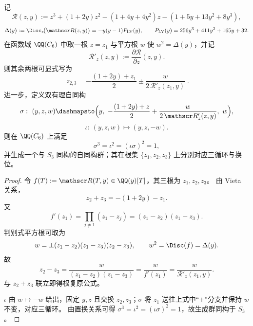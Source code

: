 \begin{theorem}\label{thm:xi-terminal-zm-s3-root-recovery-coordinate-automorphisms}
记
\[
\mathscr R(z,y):=z^3+(1+2y)z^2-(1+4y+4y^2)z-(1+5y+13y^2+8y^3),
\]
\[
\Delta(y):=\Disc_z\!\bigl(\mathscr R(z,y)\bigr)=-y(y-1)P_{\mathrm{LY}}(y),
\qquad
P_{\mathrm{LY}}(y)=256y^3+411y^2+165y+32.
\]
在函数域 \(\QQ(C_6)\) 中取一根 \(z=z_1\) 与平方根 \(w\) 使 \(w^2=\Delta(y)\)，并记
\[
\mathscr R'_z(z,y):=\frac{\partial\mathscr R}{\partial z}(z,y).
\]
则其余两根可显式写为
\[
\boxed{\;
z_{2,3}
=-\frac{(1+2y)+z_1}{2}
\pm
\frac{w}{2\,\mathscr R'_z(z_1,y)}\; }.
\]
进一步，定义双有理自同构
\[
\sigma:\ (y,z,w)\dashmapsto
\Bigl(
y,\ -\frac{(1+2y)+z}{2}+\frac{w}{2\,\mathscr R'_z(z,y)},\ w
\Bigr),
\]
\[
\iota:\ (y,z,w)\mapsto (y,z,-w).
\]
则在 \(\QQ(C_6)\) 上满足
\[
\sigma^3=\iota^2=(\iota\sigma)^2=1,
\]
并生成一个与 \(S_3\) 同构的自同构群；其在根集 \(\{z_1,z_2,z_3\}\) 上分别对应三循环与换位。
\end{theorem}
\begin{proof}
令 \(f(T):=\mathscr R(T,y)\in\QQ(y)[T]\)，其三根为 \(z_1,z_2,z_3\)。
由 Vieta 关系，
\[
z_2+z_3=-(1+2y)-z_1.
\]
又
\[
f'(z_1)=\prod_{j\neq1}(z_1-z_j)=(z_1-z_2)(z_1-z_3).
\]
判别式平方根可取为
\[
w=\pm (z_1-z_2)(z_1-z_3)(z_2-z_3),
\qquad
w^2=\Disc(f)=\Delta(y).
\]
故
\[
z_2-z_3=\frac{w}{(z_1-z_2)(z_1-z_3)}=\frac{w}{f'(z_1)}=\frac{w}{\mathscr R'_z(z_1,y)}.
\]
与 \(z_2+z_3\) 联立即得根复原公式。

\(\iota\) 由 \(w\mapsto-w\) 给出，固定 \(y,z\) 且交换 \(z_2,z_3\)；\(\sigma\) 将 \(z_1\) 送往上式中“\(+\)”分支并保持 \(w\) 不变，对应三循环。
由置换关系可得 \(\sigma^3=\iota^2=(\iota\sigma)^2=1\)，故生成群同构于 \(S_3\)。
\end{proof}

